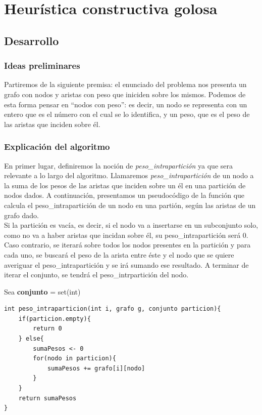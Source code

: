 \section{Heurística constructiva golosa}
\subsection{Desarrollo}
\subsubsection{Ideas preliminares}

Partiremos de la siguiente premisa: el enunciado del problema nos presenta un grafo con nodos y aristas con peso que iniciden sobre los mismos. Podemos de esta forma pensar en ``nodos con peso'': es decir, un nodo se representa con un entero que es el número con el cual se lo identifica, y un peso, que es el peso de las aristas que inciden sobre él.


\subsubsection{Explicación del algoritmo}

En primer lugar, definiremos la noción de \textit{peso\_intrapartición} ya que sera relevante a lo largo del algoritmo.
Llamaremos \textit{peso\_intrapartición} de un nodo a la suma de los pesos de las aristas que inciden sobre un él en una partición de nodos dados.
A continuación, presentamos un pseudocódigo de la función que calcula el peso\_intrapartición de un nodo en una partión, según las aristas de un grafo dado.\\
Si la partición es vacía, es decir, si el nodo va a insertarse en un subconjunto solo, como no va a haber aristas que incidan sobre él, su peso\_intrapartición será 0.\\
Caso contrario, se iterará sobre todos los nodos presentes en la partición y para cada uno, se buscará el peso de la arista entre éste y el nodo que se quiere averiguar el peso\_intrapartición y se irá sumando ese resultado. A terminar de iterar el conjunto, se tendrá el peso\_intrpartición del nodo.

Sea \textbf{conjunto} = set(int)

\begin{lstlisting}
int peso_intraparticion(int i, grafo g, conjunto particion){
	if(particion.empty){
		return 0
	} else{
		sumaPesos <- 0
		for(nodo in particion){
			sumaPesos += grafo[i][nodo]
		}
	}
	return sumaPesos
}
\end{lstlisting}

